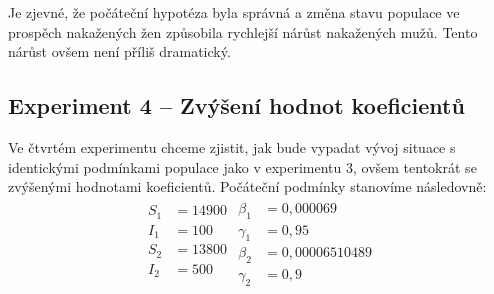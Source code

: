 \documentclass{article}
\begin{document}
Je zjevné, že počáteční hypotéza byla správná a změna stavu populace ve prospěch nakažených žen způsobila rychlejší nárůst nakažených mužů. Tento nárůst ovšem není příliš dramatický.
\newpage

\subsection{Experiment 4 -- Zvýšení hodnot koeficientů}
Ve čtvrtém experimentu chceme zjistit, jak bude vypadat vývoj situace s identickými podmínkami populace jako v experimentu 3, ovšem tentokrát se zvýšenými hodnotami koeficientů. Počáteční podmínky stanovíme následovně:
\begin{align}
\begin{split}
    S_1&=14900\\
    I_1&=100\\
    S_2&=13800\\
    I_2&=500\\
\end{split}
\begin{split}
    \beta_1&=0,000069\\
    \gamma_1&=0,95\\
    \beta_2&=0,00006510489\\
    \gamma_2&=0,9\nonumber
\end{split}
\end{align}
\end{document}
